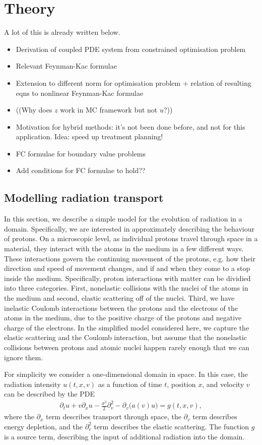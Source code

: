 \section{Theory}\label{sec:theory}
A lot of this is already written below.
\begin{itemize}
    \item Derivation of coupled PDE system from constrained optimisation problem 
    \item Relevant Feynman-Kac formulae 
    \item Extension to different norm for optimisation problem + relation of resulting eqns to nonlinear Feynman-Kac formulae
    \item ((Why does $z$ work in MC framework but not $u$?))
    \item Motivation for hybrid methods: it's not been done before, and not for this application. Idea: speed up treatment planning! 
    \item FC formulae for boundary value problems
    \item Add conditions for FC formulae to hold??
\end{itemize}

\subsection{Modelling radiation transport}
In this section, we describe a simple model for the evolution of radiation in a domain. Specifically, we are interested in approximately describing the behaviour of protons. On a microscopic level, as individual protons travel through space in a material, they interact with the atoms in the medium in a few different ways. These interactions govern the continuing movement of the protons, e.g. how their direction and speed of movement changes, and if and when they come to a stop inside the medium. Specifically, proton interactions with matter can be dividied into three categories. First, nonelastic collisions with the nuclei of the atoms in the medium and second, elastic scattering off of the nuclei. Third, we have inelastic Coulomb interactions between the protons and the electrons of the atoms in the medium, due to the positive charge of the protons and negative charge of the electrons. In the simplified model considered here, we capture the elastic scattering and the Coulomb interaction, but assume that the nonelastic collisions between protons and atomic nuclei happen rarely enough that we can ignore them. 

For simplicity we consider a one-dimensional domain in space. In this case, the radiation intensity $u(t,x,v)$ as a function of time $t$, position $x$, and velocity $v$ can be described by the PDE
%
\begin{align}
    \label{eq:pde-model}
    \partial_t u + v \partial_x u - \frac{\sigma^2}{2} \partial_v^2 - \partial_v \big( a(v) u\big) = g(t,x,v),
\end{align}
%
where the $\partial_x$ term describes transport through space, the $\partial_v$ term describes energy depletion, and the $\partial_v^2$ term describes the elastic scattering. The function $g$ is a source term, describing the input of additional radiation into the domain. 

